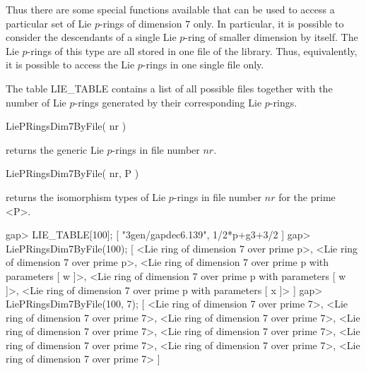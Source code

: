 Thus there are some special functions available that can be used to access
a particular set of Lie $p$-rings of dimension $7$ only. In particular, it
is possible to consider the descendants of a single Lie $p$-ring of smaller
dimension by itself. The Lie $p$-rings of this type are all stored in one
file of the library. Thus, equivalently, it is possible to access the Lie
$p$-rings in one single file only.

The table LIE_TABLE contains a list of all possible files together with
the number of Lie $p$-rings generated by their corresponding Lie $p$-rings. 

\> LiePRingsDim7ByFile( nr )

returns the generic Lie $p$-rings in file number $nr$.

\> LiePRingsDim7ByFile( nr, P )

returns the isomorphism types of Lie $p$-rings in file number $nr$ for
the prime <P>.

\beginexample
gap> LIE_TABLE[100];
[ "3gen/gapdec6.139", 1/2*p+g3+3/2 ]
gap> LiePRingsDim7ByFile(100);
[ <Lie ring of dimension 7 over prime p>, 
  <Lie ring of dimension 7 over prime p>, 
  <Lie ring of dimension 7 over prime p with parameters [ w ]>, 
  <Lie ring of dimension 7 over prime p with parameters [ w ]>, 
  <Lie ring of dimension 7 over prime p with parameters [ x ]> ]
gap> LiePRingsDim7ByFile(100, 7);
[ <Lie ring of dimension 7 over prime 7>, 
  <Lie ring of dimension 7 over prime 7>, 
  <Lie ring of dimension 7 over prime 7>, 
  <Lie ring of dimension 7 over prime 7>, 
  <Lie ring of dimension 7 over prime 7>, 
  <Lie ring of dimension 7 over prime 7>, 
  <Lie ring of dimension 7 over prime 7>, 
  <Lie ring of dimension 7 over prime 7> ]
\endexample

